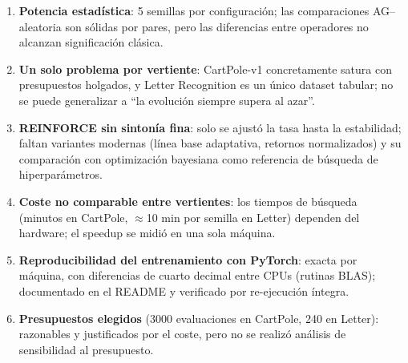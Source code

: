 \begin{enumerate}
  \item \textbf{Potencia estadística}: 5 semillas por configuración; las comparaciones AG--aleatoria son sólidas por pares, pero las diferencias entre operadores no alcanzan significación clásica.
  \item \textbf{Un solo problema por vertiente}: CartPole-v1 concretamente satura con presupuestos holgados, y Letter Recognition es un único dataset tabular; no se puede generalizar a ``la evolución siempre supera al azar''.
  \item \textbf{REINFORCE sin sintonía fina}: solo se ajustó la tasa hasta la estabilidad; faltan variantes modernas (línea base adaptativa, retornos normalizados) y su comparación con optimización bayesiana \citep{snoek2012} como referencia de búsqueda de hiperparámetros.
  \item \textbf{Coste no comparable entre vertientes}: los tiempos de búsqueda (minutos en CartPole, $\approx$10 min por semilla en Letter) dependen del hardware; el speedup se midió en una sola máquina.
  \item \textbf{Reproducibilidad del entrenamiento con PyTorch}: exacta por máquina, con diferencias de cuarto decimal entre CPUs (rutinas BLAS); documentado en el README y verificado por re-ejecución íntegra.
  \item \textbf{Presupuestos elegidos} (3000 evaluaciones en CartPole, 240 en Letter): razonables y justificados por el coste, pero no se realizó análisis de sensibilidad al presupuesto.
\end{enumerate}
